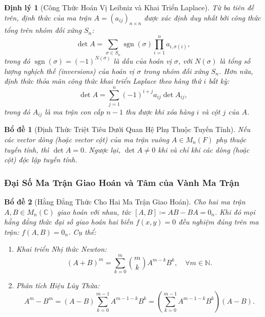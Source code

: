 \documentclass{article}
\newtheorem{dinhly}{Định lý}
\newtheorem{bode}{Bổ đề}
\begin{document}
\begin{dinhly}[Công Thức Hoán Vị Leibniz và Khai Triển Laplace]
Từ ba tiên đề trên, định thức của ma trận $A = (a_{ij})_{n \times n}$ được xác định duy nhất bởi công thức tổng trên nhóm đối xứng $S_n$:
\begin{equation}
    \det A = \sum_{\sigma \in S_n} \operatorname{sgn}(\sigma) \prod_{i=1}^n a_{i, \sigma(i)},
\end{equation}
trong đó $\operatorname{sgn}(\sigma) = (-1)^{N(\sigma)}$ là dấu của hoán vị $\sigma$, với $N(\sigma)$ là tổng số lượng nghịch thế (inversions) của hoán vị $\sigma$ trong nhóm đối xứng $S_n$.
Hơn nữa, định thức thỏa mãn công thức khai triển Laplace theo hàng thứ $i$ bất kỳ:
\begin{equation}
    \det A = \sum_{j=1}^n (-1)^{i+j} a_{ij} \det A_{ij},
\end{equation}
trong đó $A_{ij}$ là ma trận con cấp $n-1$ thu được khi xóa hàng $i$ và cột $j$ của $A$.
\end{dinhly}

\begin{bode}[Định Thức Triệt Tiêu Dưới Quan Hệ Phụ Thuộc Tuyến Tính]
Nếu các vector dòng (hoặc vector cột) của ma trận vuông $A \in M_n(F)$ phụ thuộc tuyến tính, thì $\det A = 0$. Ngược lại, $\det A \ne 0$ khi và chỉ khi các dòng (hoặc cột) độc lập tuyến tính.
\end{bode}

\subsubsection*{Đại Số Ma Trận Giao Hoán và Tâm của Vành Ma Trận}

\begin{bode}[Hằng Đẳng Thức Cho Hai Ma Trận Giao Hoán]
Cho hai ma trận $A, B \in M_n(\mathbb{C})$ giao hoán với nhau, tức $[A, B] \coloneqq AB - BA = 0_n$. Khi đó mọi hằng đẳng thức đại số giao hoán hai biến $f(x, y) = 0$ đều nghiệm đúng trên ma trận: $f(A, B) = 0_n$. Cụ thể:
\begin{enumerate}
    \item \emph{Khai triển Nhị thức Newton:}
    \begin{equation}
        (A + B)^m = \sum_{k=0}^m \binom{m}{k} A^{m-k} B^k, \quad \forall m \in \mathbb{N}.
    \end{equation}
    \item \emph{Phân tích Hiệu Lũy Thừa:}
    \begin{equation}
        A^m - B^m = (A - B) \sum_{k=0}^{m-1} A^{m-1-k} B^k = \left(\sum_{k=0}^{m-1} A^{m-1-k} B^k\right) (A - B).
    \end{equation}
\end{enumerate}
\end{bode}
\end{document}
